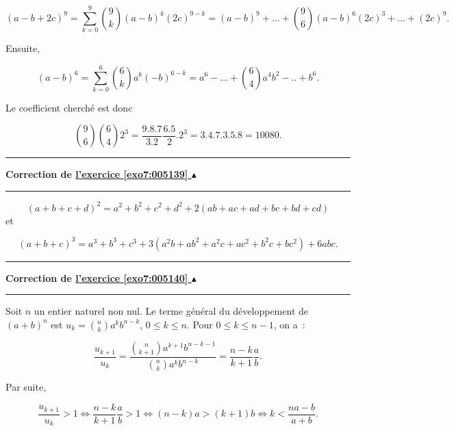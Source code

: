 \documentclass[11pt,a4paper]{article}
\newcounter{exo}
\newcommand{\correction}[1]{\hypertarget{cor7:#1}{}\label{cor7:#1}{\bf Correction de \hyperlink{exo7:#1}{l'exercice \ref{exo7:#1} $\blacktriangle$}}\vspace{1mm}\hrule\vspace{1mm}}
\newcommand{\fincorrection}{\vspace{1mm}\hrule\vspace*{7mm}}
\begin{document}
$$(a-b+2c)^9=\sum_{k=0}^{9}\binom{9}{k}(a-b)^k(2c)^{9-k}=(a-b)^9+...+\binom{9}{6}(a-b)^6(2c)^3+...+(2c)^9.$$

Ensuite,

$$(a-b)^6=\sum_{k=0}^{6}\binom{6}{k}a^k(-b)^{6-k}=a^6-...+\binom{6}{4}a^4b^2-..+b^6.$$

Le coefficient cherché est donc

$$\binom{9}{6}\binom{6}{4}2^3=\frac{9.8.7}{3.2}\frac{6.5}{2}.2^3=3.4.7.3.5.8=10080.$$
\fincorrection
\correction{005139}
 $$(a+b+c+d)^2=a^2+b^2+c^2+d^2+2(ab+ac+ad+bc+bd+cd)$$ et

$$(a+b+c)^3=a^3+b^3+c^3+3(a^2b+ab^2+a^2c+ac^2+b^2c+bc^2)+6abc.$$
\fincorrection
\correction{005140}
Soit $n$ un entier naturel non nul. Le terme général du développement de $(a+b)^n$ est $u_k=\binom{n}{k}a^kb^{n-k}$, $0\leq
k\leq n$. Pour $0\leq k\leq n-1$, on a~:

$$\frac{u_{k+1}}{u_k}=\frac{\binom{n}{k+1}a^{k+1}b^{n-k-1}}{\binom{n}{k}a^kb^{n-k}}=\frac{n-k}{k+1}\frac{a}{b}.$$

Par suite,

$$\frac{u_{k+1}}{u_k}>1\Leftrightarrow\frac{n-k}{k+1}\frac{a}{b}>1\Leftrightarrow(n-k)a>(k+1)b\Leftrightarrow k<\frac{na-b}{a+b}.$$
\end{document}
